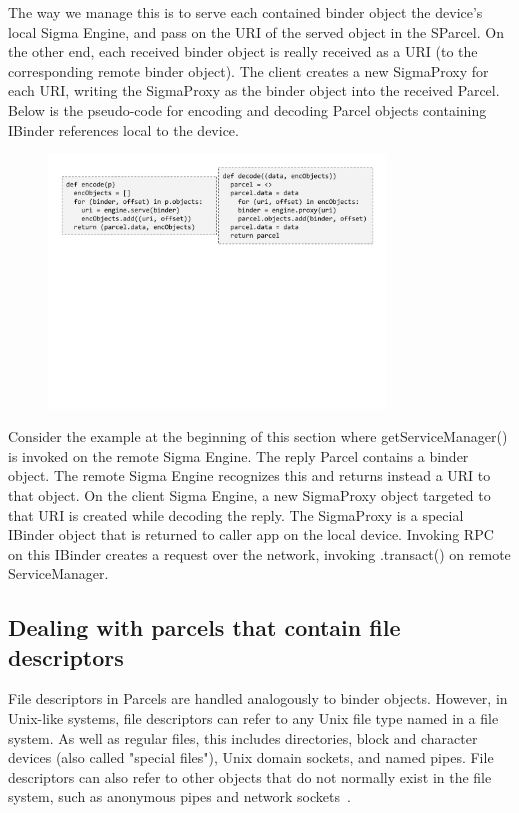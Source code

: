 \documentclass[prodmode]{acmlarge}
\begin{document}
The way we manage this is to serve each contained binder object the device's local Sigma Engine, and pass on the URI of the served object in the SParcel. On the other end, each received binder object is really received as a URI (to the corresponding remote binder object). The client creates a new SigmaProxy for each URI, writing the SigmaProxy as the binder object into the received Parcel. Below is the pseudo-code for encoding and decoding Parcel objects containing IBinder references local to the device.
\begin{figure}[h]
\centering
\includegraphics[width=0.8\textwidth]{drawings/encodeObjects.pdf}
\end{figure}

Consider the example at the beginning of this section where getServiceManager() is invoked on the remote Sigma Engine. The reply Parcel contains a binder object. The remote Sigma Engine recognizes this and returns instead a URI to that object. On the client Sigma Engine, a new SigmaProxy object targeted to that URI is created while decoding the reply. The SigmaProxy is a special IBinder object that is returned to caller app on the local device. Invoking RPC on this IBinder creates a request over the network, invoking .transact() on remote ServiceManager.

\subsection{Dealing with parcels that contain file descriptors}
File descriptors in Parcels are handled analogously to binder objects. However, in Unix-like systems, file descriptors can refer to any Unix file type named in a file system. As well as regular files, this includes directories, block and character devices (also called "special files"), Unix domain sockets, and named pipes. File descriptors can also refer to other objects that do not normally exist in the file system, such as anonymous pipes and network sockets~\cite{UnixDomainSocket}.
\end{document}
